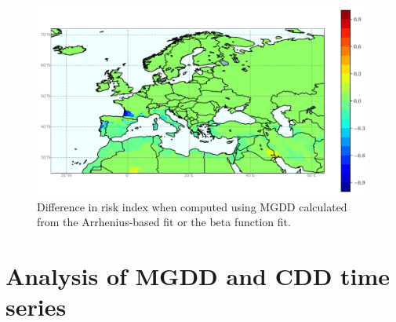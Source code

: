 \begin{figure}[H]
    \centering

    \includegraphics[width=\textwidth]{Figures/Diff_risk_beta_minus_risk.png}
    \caption[Difference on risk index using MGDD defined with an Arrhenius or
        beta function]{Difference in risk index when computed using MGDD
        calculated from the Arrhenius-based fit or the beta function fit.}
    \label{fig:R3} %
\end{figure}

\section{Analysis of MGDD and CDD time series}

